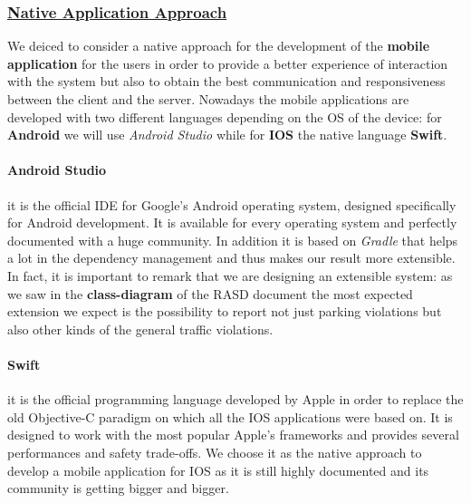 		\subsubsection[Native Application Approach]{\hyperlink{toc}{Native Application Approach}}
			\label{sec:nativeAppApproach}
			
			We deiced to consider a native approach for the development of the \textbf{mobile application} for the users in order to provide a better experience of interaction with the system but also to obtain the best communication and responsiveness between the client and the server. Nowadays the mobile applications are developed with two different languages depending on the OS of the device: for \textbf{Android} we will use \emph{Android Studio} while for \textbf{IOS} the native language \textbf{Swift}.
			
			\paragraph{Android Studio} it is the official IDE for Google's Android operating system, designed specifically for Android development. It is available for every operating system and perfectly documented with a huge community. In addition it is based on \emph{Gradle} that helps a lot in the dependency management and thus makes our result more extensible. In fact, it is important to remark that we are designing an extensible system: as we saw in the \textbf{class-diagram} of the RASD document \cite{RASD} the most expected extension we expect is the possibility to report not just parking violations but also other kinds of the general traffic violations.
			
			\paragraph{Swift} it is the official programming language developed by Apple in order to replace the old Objective-C paradigm on which all the IOS applications were based on. It is designed to work with the most popular Apple's frameworks and provides several performances and safety trade-offs. We choose it as the native approach to develop a mobile application for IOS as it is still highly documented and its community is getting bigger and bigger.